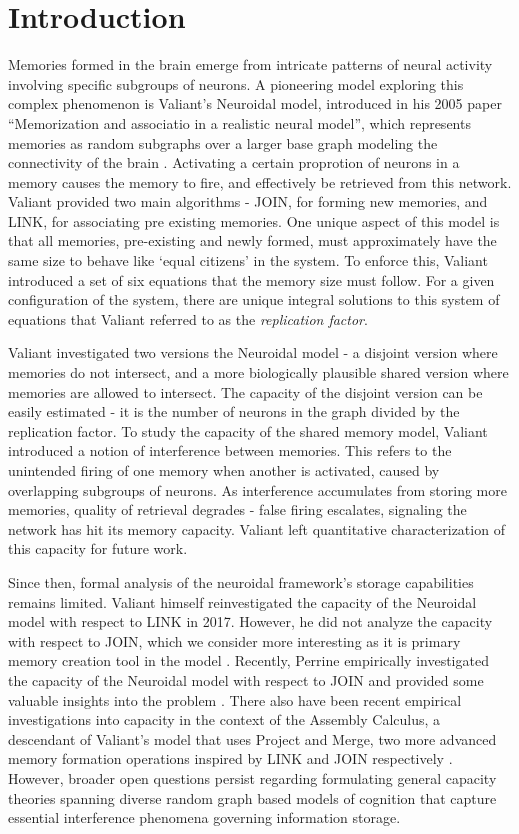 \chapter{Introduction}

Memories formed in the brain emerge from intricate patterns of neural activity involving specific subgroups of neurons. A pioneering model exploring this complex phenomenon is Valiant's Neuroidal model, introduced in his 2005 paper ``Memorization and associatio in a realistic neural model'', which represents memories as random subgraphs over a larger base graph modeling the connectivity of the brain \cite{valiant2005memorization}. Activating a certain proprotion of neurons in a memory causes the memory to fire, and effectively be retrieved from this network. Valiant provided two main algorithms - JOIN, for forming new memories, and LINK, for associating pre existing memories. One unique aspect of this model is that all memories, pre-existing and newly formed, must approximately have the same size to behave like `equal citizens' in the system. To enforce this, Valiant introduced a set of six equations that the memory size must follow. For a given configuration of the system, there are unique integral solutions to this system of equations that Valiant referred to as the \textit{replication factor}.  

Valiant investigated two versions the Neuroidal model - a disjoint version where memories do not intersect, and a more biologically plausible shared version where memories are allowed to intersect. The capacity of the disjoint version can be easily estimated - it is the number of neurons in the graph divided by the replication factor. To study the capacity of the shared memory model, Valiant introduced a notion of interference between memories. This refers to the unintended firing of one memory when another is activated, caused by overlapping subgroups of neurons. As interference accumulates from storing more memories, quality of retrieval degrades - false firing escalates, signaling the network has hit its memory capacity. Valiant left quantitative characterization of this capacity for future work.

Since then, formal analysis of the neuroidal framework's storage capabilities remains limited. Valiant himself reinvestigated the capacity of the Neuroidal model with respect to LINK in 2017. However, he did not analyze the capacity with respect to JOIN, which we consider more interesting as it is primary memory creation tool in the model \cite{valiant2017capacity}. Recently, Perrine empirically investigated the capacity of the Neuroidal model with respect to JOIN and provided some valuable insights into the problem \cite{perrine2023neural}. There also have been recent empirical investigations into capacity in the context of the Assembly Calculus, a descendant of Valiant’s model that uses Project and Merge, two more advanced memory formation operations inspired by LINK and JOIN respectively \cite{xie2023skip}. However, broader open questions persist regarding formulating general capacity theories spanning diverse random graph based models of cognition that capture essential interference phenomena governing information storage.

